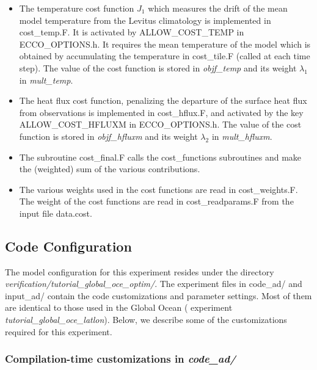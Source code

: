 \begin{itemize}

\item The temperature cost function $J_1$ which measures the drift of the mean
model temperature from the Levitus climatology is implemented in cost\_temp.F.
It is activated by ALLOW\_COST\_TEMP in ECCO\_OPTIONS.h. It requires the mean
temperature of the model which is obtained by accumulating the temperature in
cost\_tile.F (called at each time step).
The value of the cost function is stored in {\it objf\_temp} and its weight
$\lambda_1$ in {\it mult\_temp}.

\item The heat flux cost function, penalizing the departure of the surface
heat flux from observations is implemented in cost\_hflux.F, and activated by
the key ALLOW\_COST\_HFLUXM in ECCO\_OPTIONS.h. The value of the cost
function is stored in {\it objf\_hfluxm} and its weight $\lambda_2$ in
{\it mult\_hfluxm}.

\item The subroutine cost\_final.F calls the cost\_functions subroutines
and make the (weighted) sum of the various contributions.

\item The various weights used in the cost functions are read in
cost\_weights.F. The weight of the cost functions are read in
cost\_readparams.F from the input file data.cost.    

\end{itemize}


\subsection{Code Configuration}
\label{www:tutorials}
\label{SEC:eg_globest_code_config}

The model configuration for this experiment resides under the directory
{\it verification/tutorial\_global\_oce\_optim/}.  The experiment files in
code\_ad/ and input\_ad/ contain the code customizations and parameter
settings. Most of them are identical to those used in the Global Ocean
( experiment {\it  tutorial\_global\_oce\_latlon}). Below, we describe some of
the customizations required for this experiment.

\subsubsection{Compilation-time customizations in {\it code\_ad/}}

